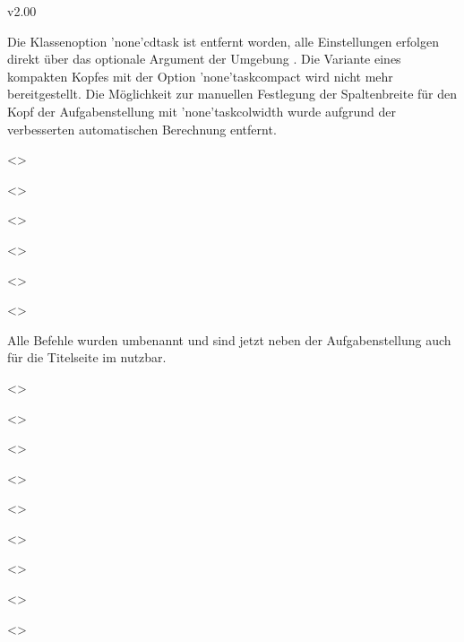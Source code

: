 \begin{Cessations}{v2.00}
\begin{Entity}{}
\begin{Cessation}
\begin{Cessation}
\begin{Cessation}
Die Klassenoption \Option*'none'{cdtask} ist entfernt worden, alle Einstellungen
erfolgen direkt über das optionale Argument der Umgebung . 
Die Variante eines kompakten Kopfes mit der Option \Option*'none'{taskcompact} 
wird nicht mehr bereitgestellt. Die Möglichkeit zur manuellen Festlegung der 
Spaltenbreite für den Kopf der Aufgabenstellung mit \Length*'none'{taskcolwidth} 
wurde aufgrund der verbesserten automatischen Berechnung entfernt.
\end{Cessation}
\end{Cessation}
\end{Cessation}

\begin{Cessation}
  {}
  <>
\begin{Cessation}
  {}
  <>
\begin{Cessation}
  {}
  <>
\begin{Cessation}
  {}
  <>
\begin{Cessation}
  {}
  <>
\begin{Cessation}
  {}
  <>
\printdeclarationlist

Alle Befehle wurden umbenannt und sind jetzt neben der Aufgabenstellung auch 
für die Titelseite im \CD nutzbar.
\end{Cessation}
\end{Cessation}
\end{Cessation}
\end{Cessation}
\end{Cessation}
\end{Cessation}

\begin{Cessation}
  {}
  <>
\begin{Cessation}
  {}
  <>
\begin{Cessation}
  {}
  <>
\begin{Cessation}
  {}
  <>
\begin{Cessation}
  {}
  <>
\begin{Cessation}
  {}
  <>
\begin{Cessation}
  {}
  <>
\begin{Cessation}
  {}
  <>
\begin{Cessation}
  {}
  <>
\printdeclarationlist


\end{Cessation}
\end{Cessation}
\end{Cessation}
\end{Cessation}
\end{Cessation}
\end{Cessation}
\end{Cessation}
\end{Cessation}
\end{Cessation}
\end{Entity}
\end{Cessations}
